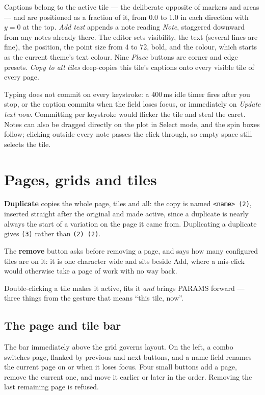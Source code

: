 \documentclass[11pt,a4paper,oneside]{report}
\newcommand{\code}[1]{\texttt{#1}}
\newcommand{\key}[1]{\textsf{\small\fbox{#1}}}
\begin{document}
Captions belong to the active tile --- the deliberate opposite of markers and
areas --- and are positioned as a fraction of it, from 0.0 to 1.0 in each
direction with $y = 0$ at the top. \emph{Add text} appends a note reading
\emph{Note}, staggered downward from any notes already there. The editor sets
visibility, the text (several lines are fine), the position, the point size from
4 to 72, bold, and the colour, which starts as the current theme's text colour.
Nine \emph{Place} buttons are corner and edge presets. \emph{Copy to all tiles}
deep-copies this tile's captions onto every visible tile of every page.

Typing does not commit on every keystroke: a 400\,ms idle timer fires after you
stop, or the caption commits when the field loses focus, or immediately on
\emph{Update text now}. Committing per keystroke would flicker the tile and
steal the caret. Notes can also be dragged directly on the plot in Select mode,
and the spin boxes follow; clicking outside every note passes the click through,
so empty space still selects the tile.

\chapter{Pages, grids and tiles}

\textbf{Duplicate} copies the whole page, tiles and all: the copy is named
\code{<name> (2)}, inserted straight after the original and made active, since a
duplicate is nearly always the start of a variation on the page it came from.
Duplicating a duplicate gives \code{(3)} rather than \code{(2) (2)}.

The \textbf{remove} button asks before removing a page, and says how many
configured tiles are on it: it is one character wide and sits beside Add, where
a mis-click would otherwise take a page of work with no way back.

Double-clicking a tile makes it active, fits it \emph{and} brings PARAMS
forward --- three things from the gesture that means ``this tile, now''.
\label{ch:pages}

\section{The page and tile bar}

The bar immediately above the grid governs layout. On the left, a combo switches
page, flanked by previous and next buttons, and a name field renames the current
page on \key{Enter} or when it loses focus. Four small buttons add a page,
remove the current one, and move it earlier or later in the order. Removing the
last remaining page is refused.
\end{document}
